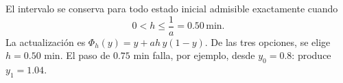 El intervalo se conserva para todo estado inicial admisible exactamente cuando
\[
0<h\le\frac1a=0.50\,\mathrm{min}.
\]
La actualización es \(\Phi_h(y)=y+ah\,y(1-y)\). De las tres opciones, se elige \(h=0.50\) min. El paso de \(0.75\) min falla, por ejemplo, desde \(y_0=0.8\): produce \(y_1=1.04\).
